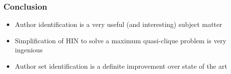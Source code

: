 
\begin{frame}
\frametitle{Conclusion}

\begin{itemize}
    \item Author identification is a very useful (and interesting) subject matter
    \item Simplification of HIN to solve a maximum quasi-clique problem is very ingenious
    \item Author set identification is a definite improvement over state of the art 
\end{itemize}




\end{frame}
